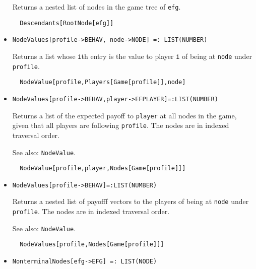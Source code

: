 \begin{itemize}
\bd 
Returns a nested list of nodes in the game tree of \verb+efg+.  
\begin{verbatim}
  Descendants[RootNode[efg]]
\end{verbatim} 
\ed

\item{}
\protect \large \begin{verbatim}
NodeValues[profile->BEHAV, node->NODE] =: LIST(NUMBER) 
\end{verbatim}\normalsize

\bd 
Returns a list whose \verb+i+th entry is the value to player \verb+i+
of being at \verb+node+ under \verb+profile+.
\begin{verbatim}
  NodeValue[profile,Players[Game[profile]],node]
\end{verbatim} 
\ed

\item{}
\protect \large \begin{verbatim}
NodeValues[profile->BEHAV,player->EFPLAYER]=:LIST(NUMBER)
\end{verbatim}\normalsize

\bd 
Returns a list of the expected payoff to \verb+player+ at
all nodes in the game, given that all players are following
\verb+profile+.  The nodes are in indexed traversal order.
\item [See also:] \verb+NodeValue+.  

\begin{verbatim}
  NodeValue[profile,player,Nodes[Game[profile]]]
\end{verbatim}

\ed

\item{}
\protect \large \begin{verbatim}
NodeValues[profile->BEHAV]=:LIST(NUMBER)
\end{verbatim}\normalsize

\bd 
Returns a nested list of payofff vectors to the players of being
at \verb+node+ under \verb+profile+.  The nodes are in indexed traversal
order.
\item [See also:] \verb+NodeValue+.  

\begin{verbatim}
  NodeValues[profile,Nodes[Game[profile]]]
\end{verbatim}

\ed

\item{}
\protect \large \begin{verbatim}
NonterminalNodes[efg->EFG] =: LIST(NODE) 
\end{verbatim}\normalsize


\end{itemize}

